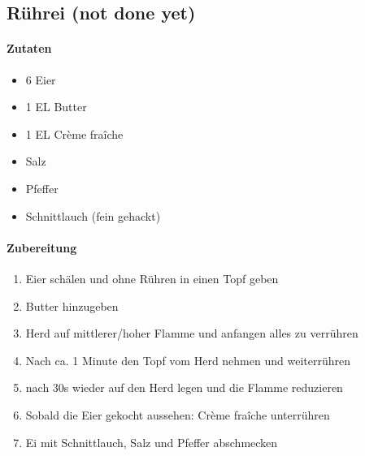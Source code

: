 \subsection{Rührei (not done yet)}
\paragraph{Zutaten}
\begin{itemize}[noitemsep]
	\item 6 Eier 
	\item 1 EL Butter
	\item 1 EL Crème fraîche
	\item Salz
	\item Pfeffer
	\item Schnittlauch (fein gehackt)
\end{itemize}
\paragraph{Zubereitung}
\begin{enumerate}[noitemsep]
	\item Eier schälen und ohne Rühren in einen Topf geben 
	\item Butter hinzugeben
	\item Herd auf mittlerer/hoher Flamme und anfangen alles zu verrühren
	\item Nach ca. 1 Minute den Topf vom Herd nehmen und weiterrühren
	\item nach 30s wieder auf den Herd legen und die Flamme reduzieren
	\item Sobald die Eier gekocht aussehen: Crème fraîche unterrühren
	\item Ei mit Schnittlauch, Salz und Pfeffer abschmecken
\end{enumerate}